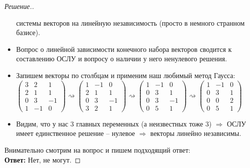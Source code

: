 \documentclass[a4paper]{article}
\theoremstyle{remark}
\begin{document}
\begin{proof}[Решение.]
\begin{itemize}
            системы векторов на линейную независимость (просто в немного
            странном базисе).
            \item Вопрос о линейной зависимости конечного набора векторов
            сводится к составлению ОСЛУ и вопросу о наличии у него 
            ненулевого решения.
            \item Запишем векторы по столбцам и применим наш любимый метод
            Гаусса: \\
            $\begin{pmatrix}
              3 & 2 & 1\\
              2 & 1 & 1 \\
              0 & 3 & -1 \\
              1 & -1 & 0  
            \end{pmatrix}
            \rightsquigarrow
            \begin{pmatrix}
              1 & -1 & 0\\
              2 & 1 & 1 \\
              0 & 3 & -1 \\
              3 & 2 & 1
            \end{pmatrix}
            \rightsquigarrow
            \begin{pmatrix}
              1 & -1 & 0\\
              0 & 3 & 1 \\
              0 & 3 & -1 \\
              0 & 5 & 1
            \end{pmatrix}
            \rightsquigarrow
            \begin{pmatrix}
              1 & -1 & 0\\
              0 & 3 & 1 \\
              0 & 0 & 2 \\
              0 & 5 & 1
            \end{pmatrix}$
            \item Видим, что у нас 3 главных переменных (а неизвестных
            тоже 3) $⇒$ ОСЛУ имеет единственное решение -- нулевое $⇒$
            векторы линейно независимы.
        \end{itemize}   
        Внимательно смотрим на вопрос и пишем подходящий ответ: \\ 
        \textbf{Ответ:} Нет, не могут.
      \end{proof}
\end{document}
